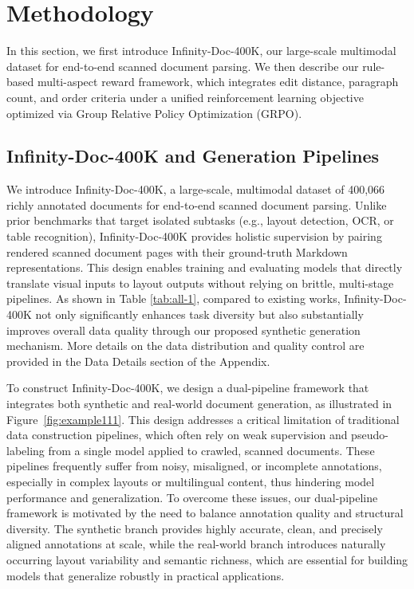 



\section{Methodology}
In this section, we first introduce Infinity-Doc-400K, our large-scale multimodal dataset for end-to-end scanned document parsing. We then describe our rule-based multi-aspect reward framework, which integrates edit distance, paragraph count, and order criteria under a unified reinforcement learning objective optimized via Group Relative Policy Optimization (GRPO). 







\subsection{Infinity-Doc-400K and Generation Pipelines }


We introduce Infinity-Doc-400K, a large-scale, multimodal dataset of 400,066 richly annotated documents for end-to-end scanned document parsing. Unlike prior benchmarks that target isolated subtasks (e.g., layout detection, OCR, or table recognition), Infinity-Doc-400K provides holistic supervision by pairing rendered scanned document pages with their ground-truth Markdown representations. This design enables training and evaluating models that directly translate visual inputs to layout outputs without relying on brittle, multi-stage pipelines. As shown in Table \ref{tab:all-1}, compared to existing works, Infinity-Doc-400K not only significantly enhances task diversity but also substantially improves overall data quality through our proposed synthetic generation mechanism. More details on the data distribution and quality control are provided in the Data Details section of the Appendix.


 

To construct Infinity-Doc-400K, we design a dual-pipeline framework that integrates both synthetic and real-world document generation, as illustrated in Figure~\ref{fig:example111}. This design addresses a critical limitation of traditional data construction pipelines, which often rely on weak supervision and pseudo-labeling from a single model applied to crawled, scanned documents. These pipelines frequently suffer from noisy, misaligned, or incomplete annotations, especially in complex layouts or multilingual content, thus hindering model performance and generalization. To overcome these issues, our dual-pipeline framework is motivated by the need to balance annotation quality and structural diversity. The synthetic branch provides highly accurate, clean, and precisely aligned annotations at scale, while the real-world branch introduces naturally occurring layout variability and semantic richness, which are essential for building models that generalize robustly in practical applications. 


